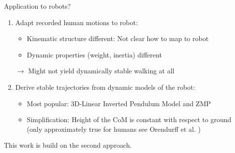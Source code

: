 \begin{frame}{Application to robots?}

\begin{enumerate}
\def\labelenumi{\arabic{enumi}.}
\item
  Adapt recorded human motions to robot:

  \begin{itemize}
  \item
    Kinematic structure different: Not clear how to map to robot
  \item
    Dynamic properties (weight, inertia) different
  \end{itemize}

  \(\rightarrow\) Might not yield dynamically stable walking at all
\item
  Derive stable trajectories from dynamic models of the robot:

  \begin{itemize}
  \item
    Most popular: 3D-Linear Inverted Pendulum Model and ZMP
  \item
    Simplification: Height of the CoM is constant with respect to ground
    (only approximately true for humans see Orendurff et al.
    \cite{orendurff2004effect})
  \end{itemize}
\end{enumerate}

This work is build on the second approach.

\end{frame}

